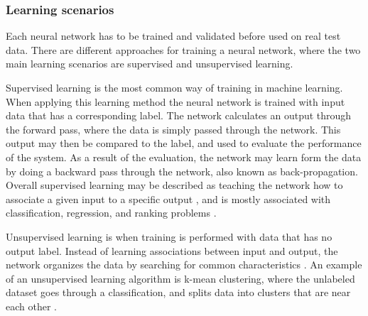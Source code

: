


\subsubsection{Learning scenarios}
Each neural network has to be trained and validated before used on real test data. There are different approaches for training a neural network, where the two main learning scenarios are supervised and unsupervised learning. 

\noindent
Supervised learning is the most common way of training in machine learning. When applying this learning method the neural network is trained with input data that has a corresponding label. The network calculates an output through the forward pass, where the data is simply passed through the network. This output may then be compared to the label, and used to evaluate the performance of the system. As a result of the evaluation, the network may learn form the data by doing a backward pass through the network, also known as back-propagation.\citep{LeCun2015} Overall supervised learning may be described as teaching the network how to associate a given input to a specific output \citep{Goodfellow2016}, and is mostly associated with classification, regression, and ranking problems \citep{Mehryar2012}. 

\noindent
Unsupervised learning is when training is performed with data that has no output label. Instead of learning associations between input and output, the network organizes the data by searching for common characteristics \citep{Mehryar2012}. An example of an unsupervised learning algorithm is k-mean clustering, where the unlabeled dataset goes through a classification, and splits data into clusters that are near each other \citep{Goodfellow2016}.  


